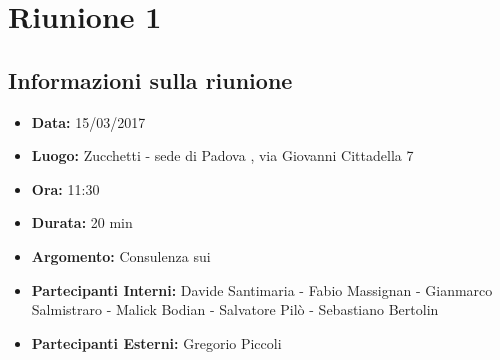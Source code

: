 	\section{Riunione 1}
	  \subsection{Informazioni sulla riunione}
	    \begin{itemize}
	      \item \textbf{Data: } 15/03/2017
	      \item \textbf{Luogo: } Zucchetti - sede di Padova , via Giovanni Cittadella 7
	      \item \textbf{Ora: } 11:30
	      \item \textbf{Durata: } 20 min
	      \item \textbf{Argomento: } Consulenza sui 
	      \item \textbf{Partecipanti Interni: } Davide Santimaria - Fabio Massignan - Gianmarco Salmistraro - Malick Bodian - Salvatore Pilò - Sebastiano Bertolin
	      \item \textbf{Partecipanti Esterni: } Gregorio Piccoli
	    \end{itemize}
	    
